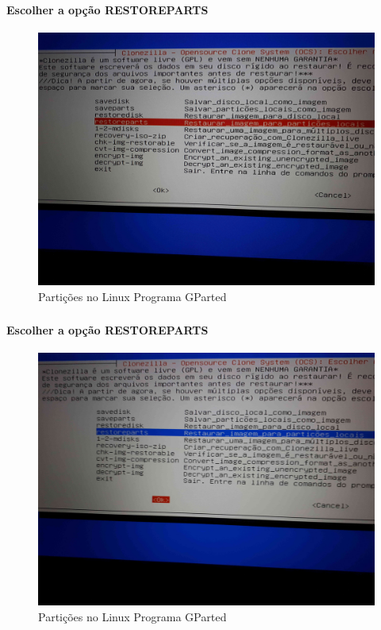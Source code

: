 \documentclass{beamer}
\begin{document}
\begin{frame}[plain,c]
   \frametitle{\insertsection}
    \framesubtitle{Escolher a opção RESTOREPARTS}
    \begin{figure}[!h]
        \includegraphics[width=1\linewidth]{images/rest/res4.jpg}
        \caption{Partições no Linux Programa GParted}
    \end{figure}
\end{frame}


\begin{frame}[plain,c]
   \frametitle{\insertsection}
    \framesubtitle{Escolher a opção RESTOREPARTS}
    \begin{figure}[!h]
        \includegraphics[width=1\linewidth]{images/rest/res5.jpg}
        \caption{Partições no Linux Programa GParted}
    \end{figure}
\end{frame}	
\end{document}
